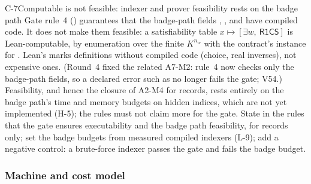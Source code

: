 \begin{issue}{C-7}{Computable is not feasible: indexer and prover feasibility rests on the badge path}
\IRprob Gate rule~4 () guarantees that the badge-path fields ,
,  and  have compiled code. It does not make them feasible: a
satisfiability table $x\mapsto[\exists w,\ \mathsf{R1CS}]$ is Lean-computable, by enumeration over the
finite $K^{n_w}$ with the contract's  instance for . Lean's
 marks definitions without compiled code (choice, real inverses), not expensive
ones. (Round~4 fixed the related A7-M2: rule~4 now checks only the badge-path fields, so a declared
error such as  no longer fails the gate; V54.)
\IRwhy Feasibility, and hence the closure of A2-M4 for records, rests entirely on the badge path's
time and memory budgets on hidden indices, which are not yet implemented (H-5); the rules must not
claim more for the gate.
\IRres State in the rules that the gate ensures executability and the badge path feasibility, for
records only; set the badge budgets from measured compiled indexers (L-9); add a negative control: a
brute-force indexer passes the gate and fails the badge budget.
\end{issue}

\subsubsection{Machine and cost model}

